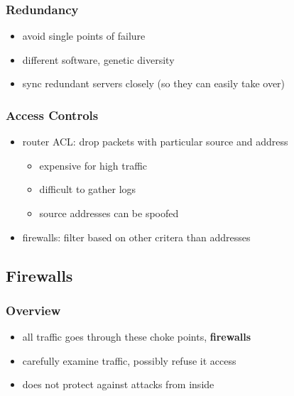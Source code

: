 \documentclass[]{article}
\theoremstyle{definition}
\begin{document}
	\subsubsection{Redundancy}
	\begin{itemize}
		\item avoid single points of failure
		\item different software, genetic diversity
		\item sync redundant servers closely (so they can easily take over)
	\end{itemize}

	\subsubsection{Access Controls}
	\begin{itemize}
		\item router ACL: drop packets with particular source and address
			\begin{itemize}
				\item expensive for high traffic
				\item difficult to gather logs
				\item source addresses can be spoofed
			\end{itemize}
		\item firewalls: filter based on other critera than addresses
	\end{itemize}

	\subsection{Firewalls}
	\subsubsection{Overview}
	\begin{itemize}
		\item all traffic goes through these choke points, \textbf{firewalls}
		\item carefully examine traffic, possibly refuse it access
		\item does not protect against attacks from inside
	\end{itemize}
\end{document}
